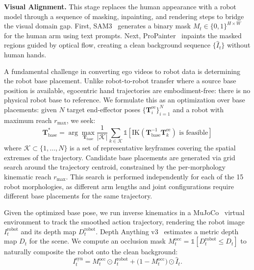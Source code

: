\textbf{Visual Alignment.} 
This stage replaces the human appearance with a robot model through a sequence of masking, inpainting, and rendering steps to bridge the visual domain gap. 
First, SAM3~\citep{carion2025sam3segmentconcepts} generates a binary mask $M_t\in\{0,1\}^{H\times W}$ for the human arm using text prompts. 
Next, ProPainter~\citep{propainter} inpaints the masked regions guided by optical flow, creating a clean background sequence $\{\hat{I}_t\}$ without human hands. 

A fundamental challenge in converting ego videos to robot data is determining the robot base placement. Unlike robot-to-robot transfer where a source base position is available, egocentric hand trajectories are embodiment-free: there is no physical robot base to reference. We formulate this as an optimization over base placements: given $N$ target end-effector poses $\{\mathbf{T}_i^\text{ee}\}_{i=1}^{N}$ and a robot with maximum reach $r_\text{max}$, we seek:
\begin{equation}
    \mathbf{T}_\text{base}^* = \arg\max_{\mathbf{T}_\text{base}} \frac{1}{|\mathcal{K}|} \sum_{k \in \mathcal{K}} \mathbb{1}\left[\text{IK}(\mathbf{T}_\text{base}^{-1} \mathbf{T}_k^\text{ee}) \text{ is feasible}\right]
\end{equation}
where $\mathcal{K} \subset \{1, \dots, N\}$ is a set of representative keyframes covering the spatial extremes of the trajectory. Candidate base placements are generated via grid search around the trajectory centroid, constrained by the per-morphology kinematic reach $r_\text{max}$. 
This search is performed independently for each of the 15 robot morphologies, as different arm lengths and joint configurations require different base placements for the same trajectory.

Given the optimized base pose, we run inverse kinematics in a MuJoCo~\citep{mujoco,Zakka_Mink_Python_inverse_2026} virtual environment to track the smoothed action trajectory, rendering the robot image $I_t^\text{robot}$ and its depth map $D_t^\text{robot}$. 
Depth Anything v3~\citep{da3} estimates a metric depth map $D_t$ for the scene. 
We compute an occlusion mask $M_t^\text{occ} = \mathbb{1}[D_t^\text{robot} \leq D_t]$ to naturally composite the robot onto the clean background:
\begin{equation}
  I_t^\text{syn} = M_t^\text{occ} \odot I_t^\text{robot}
                 + \bigl(1 - M_t^\text{occ}\bigr) \odot \hat{I}_t.
  \label{eq:composite}
\end{equation}

